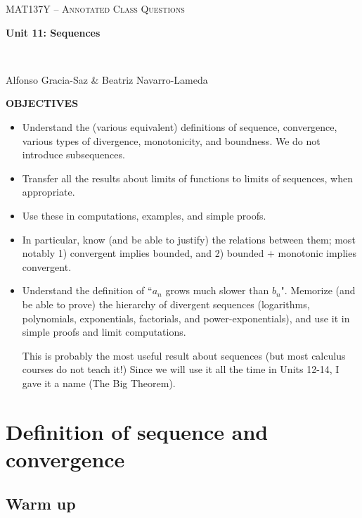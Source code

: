 \documentclass[11pt]{article}
\begin{document}
\thispagestyle{empty}
	\begin{center}
		{ {\LARGE  \scshape
		\textcolor{137cp3}{MAT137Y --   Annotated Class Questions}
		}
		
		\medskip
		{\bf \Large \textcolor{137cp1}{Unit 11: Sequences
		}}
		
		\
		
		\medskip
		{\large
		\textcolor{137cp1}{Alfonso Gracia-Saz \& Beatriz Navarro-Lameda}
		}}
	\end{center}


{\bf OBJECTIVES}

\vspace{3mm}

	\begin{itemize}
		\item Understand the (various equivalent) definitions of sequence, convergence, various types of divergence, monotonicity, and boundness.   We do not introduce subsequences.
		\item Transfer all the results about limits of functions to limits of sequences, when appropriate.
		\item Use these in computations, examples, and simple proofs.
		\item In particular, know (and be able to justify) the relations between them; most notably 1) convergent implies bounded, and 2) bounded $+$ monotonic implies convergent.
		\item Understand the definition of ``$a_n$ grows much slower than $b_n$". Memorize (and be able to prove) the hierarchy of divergent sequences (logarithms, polynomials, exponentials, factorials, and power-exponentials), and use it in simple proofs and limit computations.  
		
		This is probably the most useful result about sequences (but most calculus courses do not teach it!)  Since we will use it all the time in Units 12-14, I gave it a name (The Big Theorem).
	\end{itemize}

\vspace{3mm}

\tableofcontents

\newpage

\section{Definition of sequence and convergence}
\subsection{Warm up}
\end{document}
